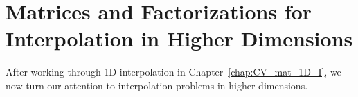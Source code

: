 \chapter{\CV{} Matrices and Factorizations for Interpolation
in Higher Dimensions}
\label{chap:CV_mat_HD_I}

After working through 1D interpolation in Chapter~\ref{chap:CV_mat_1D_I},
we now turn our attention to interpolation problems in higher dimensions.








